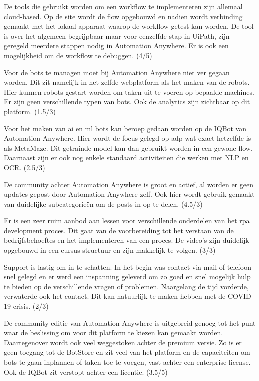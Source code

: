 De tools die gebruikt worden om een \gls{workflow} te implementeren zijn allemaal cloud-based. Op de site wordt de flow opgebouwd en nadien wordt verbinding gemaakt met het lokaal apparaat waarop de \gls{workflow} getest kan worden. De tool is over het algemeen begrijpbaar maar voor eenzelfde stap in UiPath, zijn geregeld meerdere stappen nodig in Automation Anywhere. Er is ook een mogelijkheid om de \gls{workflow} te debuggen. (4/5)

Voor de bots te managen moet bij Automation Anywhere niet ver gegaan worden. Dit zit namelijk in het zelfde webplatform als het maken van de robots. Hier kunnen robots gestart worden om taken uit te voeren op bepaalde machines. Er zijn geen verschillende typen van bots. Ook de analytics zijn zichtbaar op dit platform. (1.5/3)

Voor het maken van \acrshort{ai} en \acrshort{ml} bots kan beroep gedaan worden op de IQBot van Automation Anywhere. Hier wordt de focus gelegd op \acrfull{adp} wat exact hetzelfde is als MetaMaze. Dit getrainde model kan dan gebruikt worden in een gewone flow. Daarnaast zijn er ook nog enkele standaard \gls{activiteit}en die werken met NLP en OCR. (2.5/3)

De community achter Automation Anywhere is groot en actief, al worden er geen updates gepost door Automation Anywhere zelf. Ook hier wordt gebruik gemaakt van duidelijke subcategorieën om de posts in op te delen. (4.5/3) 

Er is een zeer ruim aanbod aan lessen voor verschillende onderdelen van het \acrshort{rpa} development proces. Dit gaat van de voorbereiding tot het verstaan van de bedrijfsbehoeftes en het implementeren van een proces. De video's zijn duidelijk opgebouwd in een cursus structuur en zijn makkelijk te volgen. (3/3)

Support is lastig om in te schatten. In het begin was contact via mail of telefoon snel gelegd en er werd een inspanning geleverd om zo goed en snel mogelijk hulp te bieden op de verschillende vragen of problemen. Naargelang de tijd vorderde, verwaterde ook het contact. Dit kan natuurlijk te maken hebben met de COVID-19 crisis. (2/3)

De community editie van Automation Anywhere is uitgebreid genoeg tot het punt waar de beslissing om voor dit platform te kiezen kan gemaakt worden. Daartegenover wordt ook veel weggestoken achter de premium versie. Zo is er geen toegang tot de BotStore en zit veel van het platform en de capaciteiten om bots te gaan inplannen of taken toe te voegen, vast achter een enterprise license. Ook de IQBot zit verstopt achter een licentie. (3.5/5)

